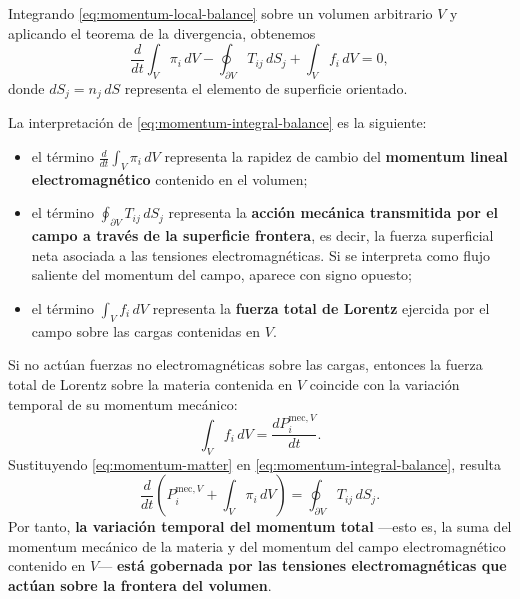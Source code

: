\documentclass[../main.tex]{subfiles}
\begin{document}
Integrando \eqref{eq:momentum-local-balance} sobre un volumen arbitrario $V$ y aplicando el teorema de la divergencia, obtenemos
\begin{equation}
    \frac{d}{dt}\int_V \pi_i\,dV
    -
    \oint_{\partial V}T_{ij}\,dS_j
    +
    \int_V f_i\,dV
    =0,
    \label{eq:momentum-integral-balance}
\end{equation}
donde $dS_j=n_j\,dS$ representa el elemento de superficie orientado.

La interpretación de \eqref{eq:momentum-integral-balance} es la siguiente:

\begin{itemize}
    \item el término $\displaystyle \frac{d}{dt}\int_V\pi_i\,dV$ representa la rapidez de cambio del \textbf{momentum lineal electromagnético} contenido en el volumen;
    \item el término $\displaystyle \oint_{\partial V}T_{ij}\,dS_j$ representa la \textbf{acción mecánica transmitida por el campo a través de la superficie frontera}, es decir, la fuerza superficial neta asociada a las tensiones electromagnéticas. Si se interpreta como flujo saliente del momentum del campo, aparece con signo opuesto;
    \item el término $\displaystyle \int_V f_i\,dV$ representa la \textbf{fuerza total de Lorentz} ejercida por el campo sobre las cargas contenidas en $V$.
\end{itemize}

Si no actúan fuerzas no electromagnéticas sobre las cargas, entonces la fuerza total de Lorentz sobre la materia contenida en $V$ coincide con la variación temporal de su momentum mecánico:
\begin{equation}
    \int_V f_i\,dV
    =
    \frac{dP_i^{\mathrm{mec},V}}{dt}.
    \label{eq:momentum-matter}
\end{equation}
Sustituyendo \eqref{eq:momentum-matter} en \eqref{eq:momentum-integral-balance}, resulta
\begin{equation}
    \frac{d}{dt}
    \left(
        P_i^{\mathrm{mec},V}
        +
        \int_V \pi_i\,dV
    \right)
    =
    \oint_{\partial V}T_{ij}\,dS_j.
    \label{eq:total-momentum-balance}
\end{equation}
Por tanto, \textbf{la variación temporal del momentum total} ---esto es, la suma del momentum mecánico de la materia y del momentum del campo electromagnético contenido en $V$--- \textbf{está gobernada por las tensiones electromagnéticas que actúan sobre la frontera del volumen}.
\end{document}
